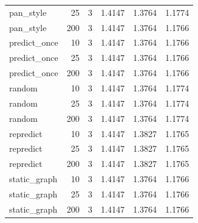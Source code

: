 \begin{table}[t]
\begin{tabular}{lrrrrr}
pan\_style & 25 & 3 & 1.4147 & 1.3764 & 1.1774 \\
pan\_style & 200 & 3 & 1.4147 & 1.3764 & 1.1766 \\
predict\_once & 10 & 3 & 1.4147 & 1.3764 & 1.1766 \\
predict\_once & 25 & 3 & 1.4147 & 1.3764 & 1.1766 \\
predict\_once & 200 & 3 & 1.4147 & 1.3764 & 1.1766 \\
random & 10 & 3 & 1.4147 & 1.3764 & 1.1774 \\
random & 25 & 3 & 1.4147 & 1.3764 & 1.1774 \\
random & 200 & 3 & 1.4147 & 1.3764 & 1.1774 \\
repredict & 10 & 3 & 1.4147 & 1.3827 & 1.1765 \\
repredict & 25 & 3 & 1.4147 & 1.3827 & 1.1765 \\
repredict & 200 & 3 & 1.4147 & 1.3827 & 1.1765 \\
static\_graph & 10 & 3 & 1.4147 & 1.3764 & 1.1766 \\
static\_graph & 25 & 3 & 1.4147 & 1.3764 & 1.1766 \\
static\_graph & 200 & 3 & 1.4147 & 1.3764 & 1.1766 \\
\bottomrule
\end{tabular}
\end{table}
